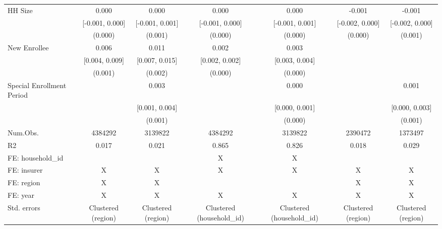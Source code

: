 \begin{table}[H]
\begin{table}[H]
\begin{tabular}[t]{lcccccc}
HH Size & 0.000 & 0.000 & 0.000 & 0.000 & -0.001 & -0.001\\
 & [-0.001, 0.000] & [-0.001, 0.001] & [-0.001, 0.000] & [-0.001, 0.001] & [-0.002, 0.000] & [-0.002, 0.000]\\
 & (0.000) & (0.001) & (0.000) & (0.000) & (0.000) & (0.001)\\
New Enrollee & 0.006 & 0.011 & 0.002 & 0.003 &  & \\
 & [0.004, 0.009] & [0.007, 0.015] & [0.002, 0.002] & [0.003, 0.004] &  & \\
 & (0.001) & (0.002) & (0.000) & (0.000) &  & \\
Special Enrollment Period &  & 0.003 &  & 0.000 &  & 0.001\\
 &  & [0.001, 0.004] &  & [0.000, 0.001] &  & [0.000, 0.003]\\
 &  & (0.001) &  & (0.000) &  & (0.001)\\
\midrule
Num.Obs. & 4384292 & 3139822 & 4384292 & 3139822 & 2390472 & 1373497\\
R2 & 0.017 & 0.021 & 0.865 & 0.826 & 0.018 & 0.029\\
FE: household\_id &  &  & X & X &  & \\
FE: insurer & X & X & X & X & X & X\\
FE: region & X & X &  &  & X & X\\
FE: year & X & X & X & X & X & X\\
Std. errors & Clustered (region) & Clustered (region) & Clustered (household\_id) & Clustered (household\_id) & Clustered (region) & Clustered (region)\\
\bottomrule
\end{tabular}
\end{table}
\end{table}
